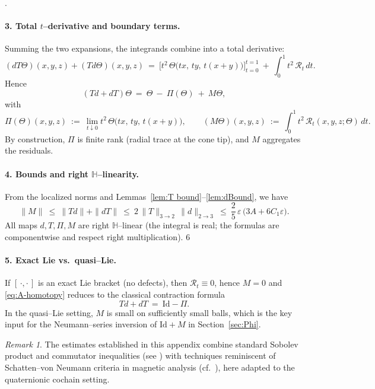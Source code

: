\documentclass[10pt]{amsart}
\numberwithin{equation}{section}
\theoremstyle{remark}
\newtheorem{rmk}[theorem]{Remark}
\theoremstyle{definition}
\begin{document}
.
\paragraph{3. Total $t$--derivative and boundary terms.}
Summing the two expansions, the integrands combine into a total derivative:
\[
(dT\Theta)(x,y,z)+(Td\Theta)(x,y,z)
\ =\ \Big[t^2\,\Theta\big(tx,\,ty,\,t(x+y)\big)\Big]_{t=0}^{t=1}
\ +\ \int_0^1 t^2\,\mathcal R_t\,dt.
\]
Hence
\begin{equation}\label{eq:A-homotopy}
(Td+dT)\Theta \ =\ \Theta\ -\ \Pi(\Theta)\ +\ M\Theta,
\end{equation}
with
\[
\Pi(\Theta)(x,y,z)\ :=\ \lim_{t\downarrow 0} t^2\,\Theta\big(tx,\,ty,\,t(x+y)\big),
\qquad
(M\Theta)(x,y,z)\ :=\ \int_0^1 t^2\,\mathcal R_t(x,y,z;\Theta)\,dt.
\]
By construction, $\Pi$ is finite rank (radial trace at the cone tip), and $M$ aggregates the residuals.
\paragraph{4. Bounds and right $\mathbb H$--linearity.}
From the localized norms and Lemmas~\ref{lem:T bound}--\ref{lem:dBound}, we have
\[
\|M\|\ \le\ \|Td\|+\|dT\|\ \le\ 2\,\|T\|_{3\to 2}\,\|d\|_{2\to 3}
\ \le\ \frac{2}{5}\,\varepsilon\,\big(3A+6C_1\varepsilon\big).
\]
All maps $d,T,\Pi,M$ are right $\mathbb H$--linear (the integral is real; the formulas are componentwise and respect right multiplication).
6
\paragraph{5. Exact Lie vs.~quasi--Lie.}
If $[\,\cdot,\cdot\,]$ is an exact Lie bracket (no defects), then $\mathcal R_t\equiv 0$, hence $M=0$ and \eqref{eq:A-homotopy} reduces to the classical contraction formula
\[
Td+dT\ =\ \mathrm{Id}-\Pi.
\]
In the quasi--Lie setting, $M$ is small on sufficiently small balls, which is the key input for the Neumann--series inversion of $\mathrm{Id}+M$ in Section~\ref{sec:Phi}.

\begin{rmk}
The estimates established in this appendix combine standard Sobolev product and commutator inequalities
(see \cite{Adams2003}) with techniques reminiscent of Schatten--von Neumann criteria in magnetic analysis
(cf.~\cite{AthmouniPurice-CPDE-2018}), here adapted to the quaternionic cochain setting.
\end{rmk}
\end{document}

